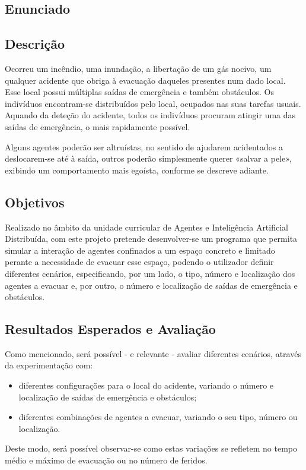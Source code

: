 \documentclass[12pt]{article}
\begin{document}
\begin{titlepage}

\section{Enunciado}

\subsection{Descrição}

Ocorreu um incêndio, uma inundação, a libertação de um gás nocivo, um qualquer acidente que obriga à evacuação daqueles presentes num dado local. Esse local possui múltiplas saídas de emergência e também obstáculos. Os indivíduos encontram-se distribuídos pelo local, ocupados nas suas tarefas usuais. Aquando da deteção do acidente, todos os indivíduos procuram atingir uma das saídas de emergência, o mais rapidamente possível.

Alguns agentes poderão ser altruístas, no sentido de ajudarem acidentados a deslocarem-se até à saída, outros poderão simplesmente querer «salvar a pele», exibindo um comportamento mais egoísta, conforme se descreve adiante.


\subsection{Objetivos}

Realizado no âmbito da unidade curricular de Agentes e Inteligência Artificial Distribuída, com este projeto pretende desenvolver-se um programa que permita simular a interação de agentes confinados a um espaço concreto e limitado perante a necessidade de evacuar esse espaço, podendo o utilizador definir diferentes cenários, especificando, por um lado, o tipo, número e localização dos agentes a evacuar e, por outro, o número e localização de saídas de emergência e obstáculos.


\subsection{Resultados Esperados e Avaliação}

Como mencionado, será possível - e relevante - avaliar diferentes cenários, através da experimentação com:
\begin{itemize}
	\item diferentes configurações para o local do acidente, variando o número e localização de saídas de emergência e obstáculos;
	\item diferentes combinações de agentes a evacuar, variando o seu tipo, número ou localização.
\end{itemize}
Deste modo, será possível observar-se como estas variações se refletem no tempo médio e máximo de evacuação ou no número de feridos.


\end{titlepage}
\end{document}
